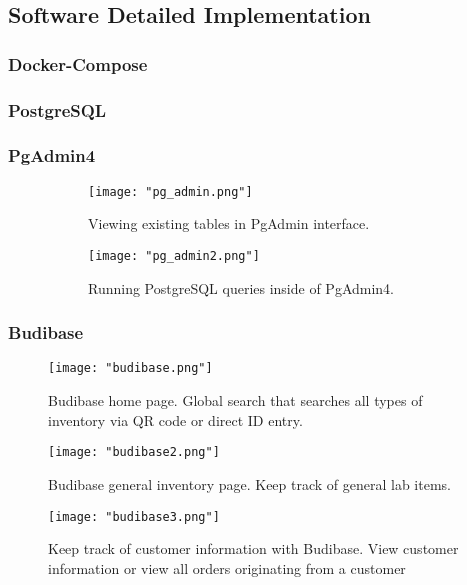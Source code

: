 \documentclass{article}
\begin{document}
\subsection{Software Detailed Implementation}
\subsubsection{Docker-Compose}
\subsubsection{PostgreSQL}
\subsubsection{PgAdmin4}
\begin{figure}[h!]
    \centering
    \begin{subfigure}[b]{.45\textwidth}
        \centering
        \texttt{[image: "pg\_admin.png"]}
        \caption{Viewing existing tables in PgAdmin interface.}
        \label{fig:pg_admin_tables}
    \end{subfigure}
    \begin{subfigure}[b]{.45\textwidth}
        \centering
        \texttt{[image: "pg\_admin2.png"]}
        \caption{Running PostgreSQL queries inside of PgAdmin4.}
        \label{fig:pg_admin_queries}
    \end{subfigure}
    \caption{}
    \label{fig:pg_admin_figs}
\end{figure}
\subsubsection{Budibase}
\begin{figure}[h!]
    \centering
    \texttt{[image: "budibase.png"]}
    \caption{Budibase home page. Global search that searches all types of inventory via QR code or direct ID entry.}
    \label{fig:budibase_home}
\end{figure}
\begin{figure}[h!]
    \centering
    \texttt{[image: "budibase2.png"]}
    \caption{Budibase general inventory page. Keep track of general lab items.}
    \label{fig:budibase_gen_inv}
\end{figure}
\begin{figure}[h!]
    \centering
    \texttt{[image: "budibase3.png"]}
    \caption{Keep track of customer information with Budibase. View customer information or view all orders originating from a
    customer}
    \label{fig:budibase_customers}
\end{figure}
\end{document}
